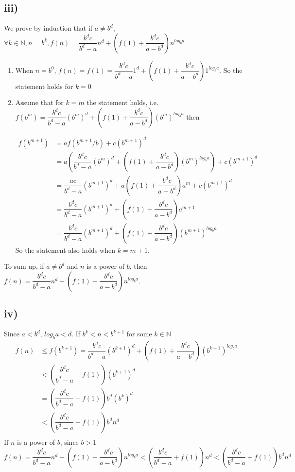 \documentclass[a4paper,12pt,titlepage]{article}
\begin{document}
\subsection*{iii)}
We prove by induction that if $a\neq b^d$, $\forall k\in\mathbb{N},n=b^k,f(n)=\dfrac{b^dc}{b^d-a}n^d+(f(1)+\dfrac{b^dc}{a-b^d})n^{log_ba}$
\begin{enumerate}
\item When $n=b^0$, $f(n)=f(1)=\dfrac{b^dc}{b^d-a}1^d+(f(1)+\dfrac{b^dc}{a-b^d})1^{log_ba}$. So the statement holds for $k=0$
\item Assume that for $k=m$ the statement holds, i.e. $f(b^m)=\dfrac{b^dc}{b^d-a}(b^m)^d+(f(1)+\dfrac{b^dc}{a-b^d})(b^m)^{log_ba}$
then 

\begin{align*}
f(b^{m+1})&=af(b^{m+1}/b)+c(b^{m+1})^d\\
&=a(\dfrac{b^dc}{b^d-a}(b^m)^d+(f(1)+\dfrac{b^dc}{a-b^d})(b^m)^{log_ba})+c(b^{m+1})^d\\
&=\dfrac{ac}{b^d-a}(b^{m+1})^d+a(f(1)+\dfrac{b^dc}{a-b^d})a^m+c(b^{m+1})^d\\
&=\dfrac{b^dc}{b^d-a}(b^{m+1})^d+(f(1)+\dfrac{b^dc}{a-b^d})a^{m+1}\\
&=\dfrac{b^dc}{b^d-a}(b^{m+1})^d+(f(1)+\dfrac{b^dc}{a-b^d})(b^{m+1})^{log_ba}
\end{align*}
So the statement also holds when $k=m+1$.
\end{enumerate}

To sum up, if $a\neq b^d$ and $n$ is a power of $b$, then $f(n)=\dfrac{b^dc}{b^d-a}n^d+(f(1)+\dfrac{b^dc}{a-b^d})n^{log_ba}$.


\subsection*{iv)}
Since $a<b^d$, $log_ba<d$.
If $b^k<n<b^{k+1}$ for some $k\in\mathbb{N}$
\begin{align*}
f(n)&\leqslant f(b^{k+1})=\dfrac{b^dc}{b^d-a}(b^{k+1})^d+(f(1)+\dfrac{b^dc}{a-b^d})(b^{k+1})^{log_ba}\\
&<(\dfrac{b^dc}{b^d-a}+f(1))(b^{k+1})^d\\
&=(\dfrac{b^dc}{b^d-a}+f(1))b^d(b^{k})^d\\
&<(\dfrac{b^dc}{b^d-a}+f(1))b^dn^d\\
\end{align*}
If $n$ is a power of $b$, since $b>1$
$$f(n)=\dfrac{b^dc}{b^d-a}n^d+(f(1)+\dfrac{b^dc}{a-b^d})n^{log_ba}<(\dfrac{b^dc}{b^d-a}+f(1))n^d<(\dfrac{b^dc}{b^d-a}+f(1))b^dn^d$$
\end{document}
